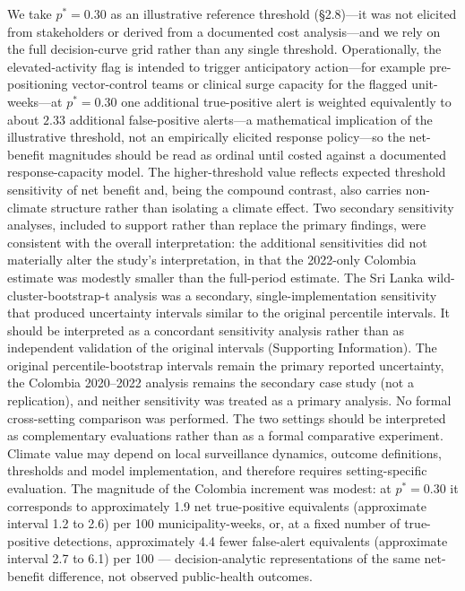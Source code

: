 \documentclass[11pt,a4paper]{article}
\begin{document}
We take $p^*=0.30$ as an illustrative reference threshold (\S2.8)---it was not elicited from stakeholders or derived from a documented cost analysis---and we rely on the full decision-curve grid rather than any single threshold. Operationally, the elevated-activity flag is intended to trigger anticipatory action---for example pre-positioning vector-control teams or clinical surge capacity for the flagged unit-weeks---at $p^*=0.30$ one additional true-positive alert is weighted equivalently to about $2.33$ additional false-positive alerts---a mathematical implication of the illustrative threshold, not an empirically elicited response policy---so the net-benefit magnitudes should be read as ordinal until costed against a documented response-capacity model. The higher-threshold value reflects expected threshold sensitivity of net benefit and, being the compound contrast, also carries non-climate structure rather than isolating a climate effect. Two secondary sensitivity analyses, included to support rather than replace the primary findings, were consistent with the overall interpretation: the additional sensitivities did not materially alter the study's interpretation, in that the 2022-only Colombia estimate was modestly smaller than the full-period estimate. The Sri Lanka wild-cluster-bootstrap-t analysis was a secondary, single-implementation sensitivity that produced uncertainty intervals similar to the original percentile intervals. It should be interpreted as a concordant sensitivity analysis rather than as independent validation of the original intervals (Supporting Information). The original percentile-bootstrap intervals remain the primary reported uncertainty, the Colombia 2020--2022 analysis remains the secondary case study (not a replication), and neither sensitivity was treated as a primary analysis. No formal cross-setting comparison was performed. The two settings should be interpreted as complementary evaluations rather than as a formal comparative experiment. Climate value may depend on local surveillance dynamics, outcome definitions, thresholds and model implementation, and therefore requires setting-specific evaluation. The magnitude of the Colombia increment was modest: at $p^*=0.30$ it corresponds to approximately 1.9 net true-positive equivalents (approximate interval 1.2 to 2.6) per 100 municipality-weeks, or, at a fixed number of true-positive detections, approximately 4.4 fewer false-alert equivalents (approximate interval 2.7 to 6.1) per 100 --- decision-analytic representations of the same net-benefit difference, not observed public-health outcomes.
\end{document}
